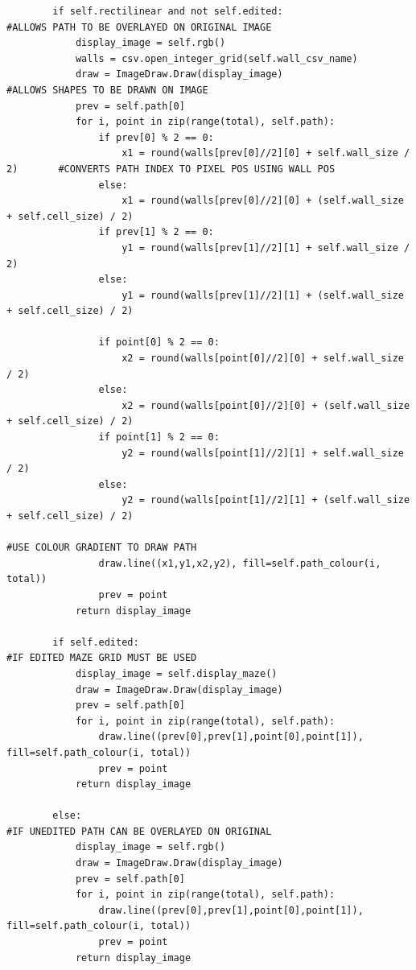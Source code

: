 \documentclass[titlepage]{article}
\begin{document}
\begin{changemargin}{-1in}{-1in}
\begin{verbatim}
        if self.rectilinear and not self.edited:                                #ALLOWS PATH TO BE OVERLAYED ON ORIGINAL IMAGE
            display_image = self.rgb()
            walls = csv.open_integer_grid(self.wall_csv_name)
            draw = ImageDraw.Draw(display_image)                                #ALLOWS SHAPES TO BE DRAWN ON IMAGE
            prev = self.path[0]
            for i, point in zip(range(total), self.path):
                if prev[0] % 2 == 0:
                    x1 = round(walls[prev[0]//2][0] + self.wall_size / 2)       #CONVERTS PATH INDEX TO PIXEL POS USING WALL POS
                else:
                    x1 = round(walls[prev[0]//2][0] + (self.wall_size + self.cell_size) / 2)
                if prev[1] % 2 == 0:
                    y1 = round(walls[prev[1]//2][1] + self.wall_size / 2)
                else:
                    y1 = round(walls[prev[1]//2][1] + (self.wall_size + self.cell_size) / 2) 

                if point[0] % 2 == 0:
                    x2 = round(walls[point[0]//2][0] + self.wall_size / 2)
                else:
                    x2 = round(walls[point[0]//2][0] + (self.wall_size + self.cell_size) / 2)
                if point[1] % 2 == 0:
                    y2 = round(walls[point[1]//2][1] + self.wall_size / 2)
                else:
                    y2 = round(walls[point[1]//2][1] + (self.wall_size + self.cell_size) / 2)
                                                                                #USE COLOUR GRADIENT TO DRAW PATH
                draw.line((x1,y1,x2,y2), fill=self.path_colour(i, total))
                prev = point
            return display_image

        if self.edited:                                                         #IF EDITED MAZE GRID MUST BE USED
            display_image = self.display_maze()
            draw = ImageDraw.Draw(display_image)
            prev = self.path[0]
            for i, point in zip(range(total), self.path):
                draw.line((prev[0],prev[1],point[0],point[1]), fill=self.path_colour(i, total))
                prev = point
            return display_image

        else:                                                                   #IF UNEDITED PATH CAN BE OVERLAYED ON ORIGINAL
            display_image = self.rgb()
            draw = ImageDraw.Draw(display_image)
            prev = self.path[0]
            for i, point in zip(range(total), self.path):
                draw.line((prev[0],prev[1],point[0],point[1]), fill=self.path_colour(i, total))
                prev = point
            return display_image


\end{verbatim}
\end{changemargin}
\end{document}
